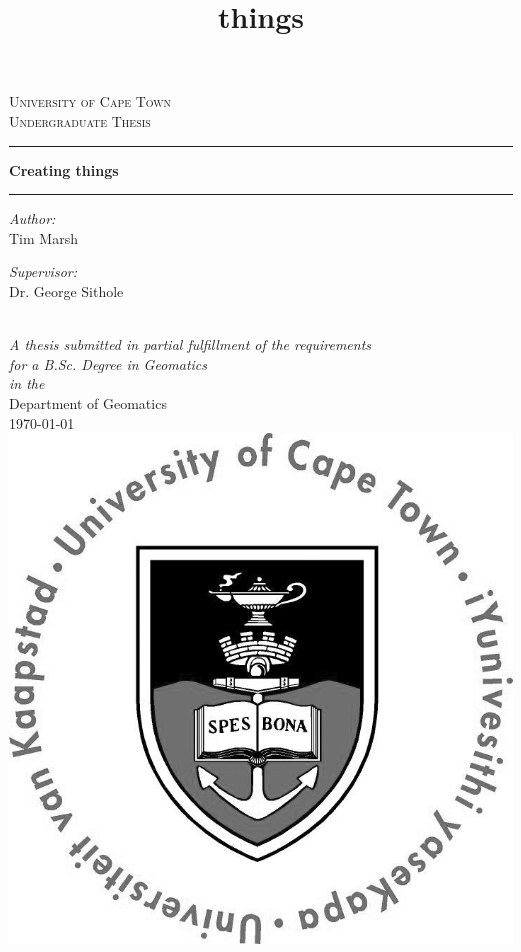 

\begin{center}
	
	\textsc{\LARGE University of Cape Town}\\[1.5cm]
	\textsc{\Large Undergraduate Thesis}\\[0.5cm]
	
	\hrule
	\vspace{0.4cm}
	\title{things}
	{\huge \bfseries Creating things}\\[0.4cm]
	\hrule
	\vspace{1.5cm}
	
	\begin{minipage}{0.4\textwidth}
		\begin{flushleft} \large
			\emph{Author:}\\
			\textnormal{Tim Marsh}
		\end{flushleft}
	\end{minipage}
	\begin{minipage}{0.4\textwidth}
		\begin{flushright} \large
			\emph{Supervisor:} \\
			\textnormal{Dr. George Sithole}
		\end{flushright}
	\end{minipage}\\[3cm]
	
	\large \textit{A thesis submitted in partial fulfillment of the requirements\\ for a B.Sc. Degree in Geomatics}\\[0.3cm]
	\textit{in the}\\[0.4cm]
	Department of Geomatics\\[1.5cm]
	
	{\large \today}\\[0.5cm]
	\includegraphics[scale=0.75]{Includes/images/UCTcircular_logo1_CMYK}
	
	\vfill
\end{center}
